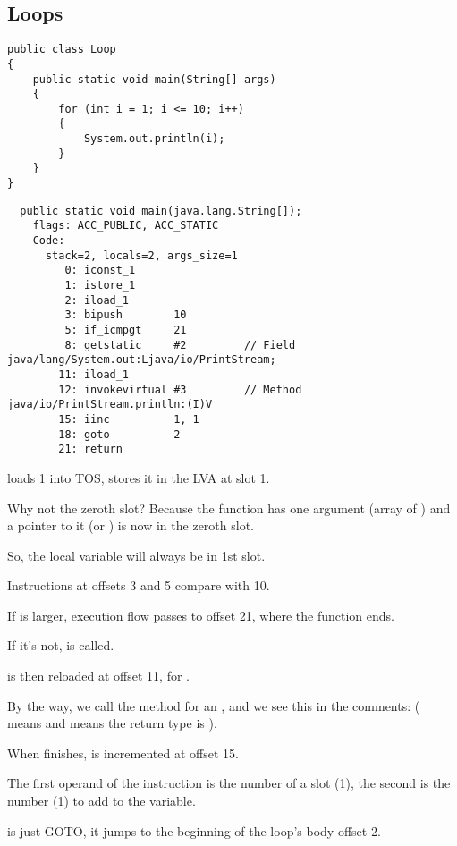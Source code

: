 \subsection{Loops}

\begin{lstlisting}
public class Loop
{
	public static void main(String[] args)
	{ 
		for (int i = 1; i <= 10; i++)
		{
			System.out.println(i); 
		}               
	}
}
\end{lstlisting}

\begin{lstlisting}
  public static void main(java.lang.String[]);
    flags: ACC_PUBLIC, ACC_STATIC
    Code:
      stack=2, locals=2, args_size=1
         0: iconst_1      
         1: istore_1      
         2: iload_1       
         3: bipush        10
         5: if_icmpgt     21
         8: getstatic     #2         // Field java/lang/System.out:Ljava/io/PrintStream;
        11: iload_1       
        12: invokevirtual #3         // Method java/io/PrintStream.println:(I)V
        15: iinc          1, 1
        18: goto          2
        21: return        
\end{lstlisting}

 loads 1 into \ac{TOS},  stores it in the \ac{LVA} at slot 1.

Why not the zeroth slot?
Because the \main function has one argument (array of ) 
and a pointer to it (or ) is now in the zeroth slot.


So, the  local variable will always be in 1st slot.


Instructions at offsets 3 and 5 compare  with 10.

If  is larger, execution flow passes to offset 21, where the function ends.

If it's not,  is called.

 is then reloaded at offset 11, for .

By the way, we call the  method for an , 
and we see this in the comments: 
( means  and  means the return type is ).


When  finishes,  is incremented at offset 15.

The first operand of the instruction is the  number of a slot (1), 
the second is the number (1) to add to the variable.


 is just GOTO, it jumps to the beginning of the loop's body offset 2.


